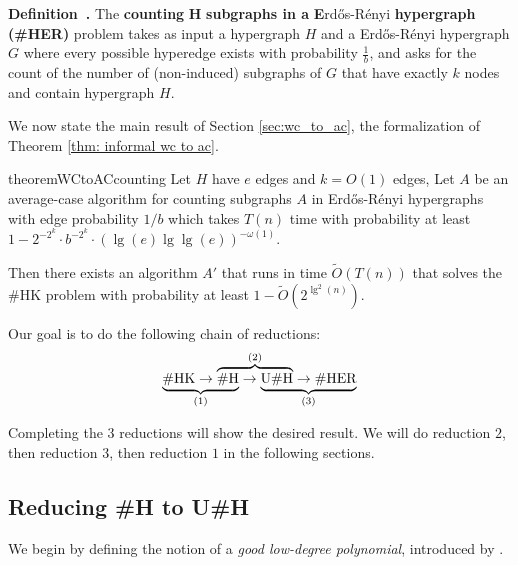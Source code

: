 \documentclass[11pt,letterpaper,pdftex]{article}
\newcounter{definition}
\newenvironment{definition}[1][]{\refstepcounter{definition}\par\medskip
   \noindent \textbf{Definition~\thedefinition. #1} \rmfamily}{\medskip}
\newcommand{\erdosRen}{Erd{\H{o}}s-R{\'{e}}nyi }
\def\Otil{\tilde{O}}
\begin{document}
\begin{definition}\label{def: HER}
The \textbf{counting }$\boldsymbol{H}$ \textbf{subgraphs in a } \textbf\erdosRen \textbf{ hypergraph (\#HER)} problem takes as input a hypergraph $H$ and a \erdosRen hypergraph $G$ where every possible hyperedge exists with probability $\frac1b$, and asks for the count of the number of (non-induced) subgraphs of $G$ that have exactly $k$ nodes and contain hypergraph $H$.
\end{definition}




We now state the main result of Section \ref{sec:wc_to_ac}, the formalization of Theorem \ref{thm: informal wc to ac}.




\begin{restatable}{theorem}{WCtoACcounting}\label{thm: WCtoACcounting}
Let $H$ have $e$ edges and $k = O(1)$ edges, Let $A$ be an average-case algorithm for counting subgraphs $A$ in \erdosRen hypergraphs with edge probability $1/b$ which takes $T(n)$ time with probability at least $1-2^{-2^k} \cdot b^{-2^k} \cdot (\lg (e) \lg\lg(e))^{-\omega(1)}$.

Then there exists an algorithm $A'$ that runs in time $\Otil(T(n))$ that solves the \#HK problem with probability at least $1-\Otil(2^{\lg^2(n)})$.
\end{restatable}



Our goal is to do the following chain of reductions:
\[
\mathrlap{\underbrace{\phantom{\text{\#HK}\rightarrow\text{\#H}}}_\text{(1)}} \text{\#HK}\rightarrow\mathrlap{\overbrace{\phantom{\text{\#H}\rightarrow\text{U\#H}}}^\text{(2)}} \text{\#H}\rightarrow\underbrace{\text{U\#H} \rightarrow\text{\#HER}}_\text{(3)}
\]

Completing the $3$ reductions will show the desired result. We will do reduction $2$, then reduction $3$, then reduction $1$ in the following sections.

\subsection{Reducing \#H to U\#H}\label{sec: H to UH}

We begin by defining the notion of a \emph{good low-degree polynomial}, introduced by \cite{factoredProblems}.
\end{document}
